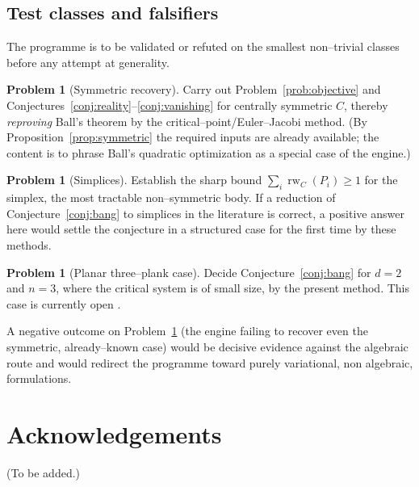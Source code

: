 \documentclass[11pt,reqno]{amsart}
\theoremstyle{plain}
\theoremstyle{definition}
\newtheorem{problem}[theorem]{Problem}
\newcommand{\relw}{\operatorname{rw}}
\begin{document}
\subsection{Test classes and falsifiers}
The programme is to be validated or refuted on the smallest non--trivial classes
before any attempt at generality.

\begin{problem}[Symmetric recovery]\label{prob:M1}
Carry out Problem~\ref{prob:objective} and
Conjectures~\ref{conj:reality}--\ref{conj:vanishing} for centrally symmetric
$C$, thereby \emph{reproving} Ball's theorem \cite{Ball1991} by the
critical--point/Euler--Jacobi method. (By Proposition~\ref{prop:symmetric} the
required inputs are already available; the content is to phrase Ball's quadratic
optimization as a special case of the engine.)
\end{problem}

\begin{problem}[Simplices]\label{prob:M2}
Establish the sharp bound $\sum_i\relw_C(P_i)\ge1$ for the simplex, the most
tractable non--symmetric body. If a reduction of Conjecture~\ref{conj:bang} to
simplices in the literature is correct, a positive answer here would settle the
conjecture in a structured case for the first time by these methods.
\end{problem}

\begin{problem}[Planar three--plank case]\label{prob:M3b}
Decide Conjecture~\ref{conj:bang} for $d=2$ and $n=3$, where the critical system
is of small size, by the present method. This case is currently open
\cite{Verreault2026,KupavskiiPach2017}.
\end{problem}

A negative outcome on Problem~\ref{prob:M1} (the engine failing to recover even
the symmetric, already--known case) would be decisive evidence against the
algebraic route and would redirect the programme toward purely variational, non
algebraic, formulations.

\section*{Acknowledgements}
(To be added.)
\end{document}
